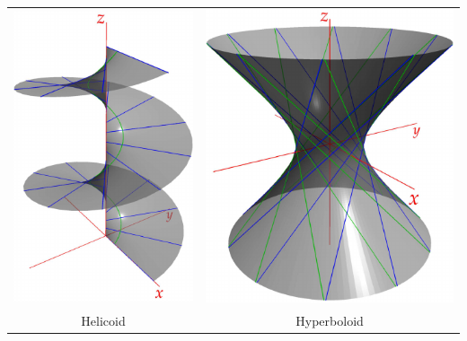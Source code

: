 \begin{examples}{}{}
\begin{enumerate}
\begin{center}
\begin{tabular}{c@{\qquad\qquad}c}
\href{http://www.math.uci.edu/~ndonalds/math162a/surfaces-helicoid.html}{\includegraphics{surfaces-helicoid}}&\href{http://www.math.uci.edu/~ndonalds/math162a/surfaces-hyper.html}{\includegraphics{surfaces-hyper}}\\
Helicoid&Hyperboloid
\end{tabular}
\end{center}


\end{enumerate}
\end{examples}







